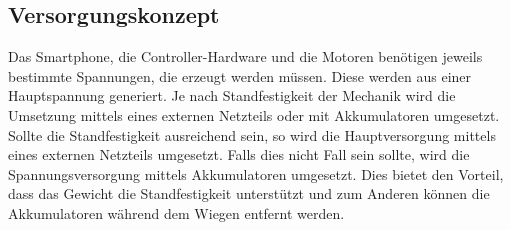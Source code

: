 \subsection{Versorgungskonzept}
	Das Smartphone, die Controller-Hardware und die Motoren benötigen jeweils bestimmte Spannungen, die erzeugt werden müssen. Diese werden aus einer Hauptspannung generiert. Je nach Standfestigkeit der Mechanik wird die Umsetzung mittels eines externen Netzteils oder mit Akkumulatoren umgesetzt. Sollte die Standfestigkeit ausreichend sein, so wird die Hauptversorgung mittels eines externen Netzteils umgesetzt. Falls dies nicht Fall sein sollte, wird die Spannungsversorgung mittels Akkumulatoren umgesetzt. Dies bietet den Vorteil, dass das Gewicht die Standfestigkeit unterstützt und zum Anderen können die Akkumulatoren während dem Wiegen entfernt werden.